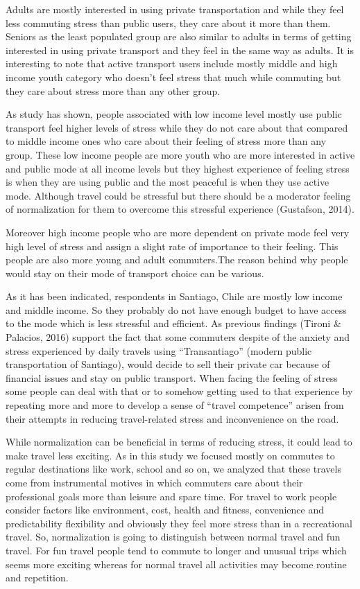 \documentclass[
11pt, %
oneside, %
english, %
singlespacing, %
]{macthesis} %
\begin{document}
Adults are mostly interested in using private transportation and while they feel less commuting stress than public users, they care about it more than them. Seniors as the least populated group are also similar to adults in terms of getting interested in using private transport and they feel in the same way as adults. It is interesting to note that active transport users include mostly middle and high income youth category who doesn't feel stress that much while commuting but they care about stress more than any other group.

As study has shown, people associated with low income level mostly use public transport feel higher levels of stress while they do not care about that compared to middle income ones who care about their feeling of stress more than any group. These low income people are more youth who are more interested in active and public mode at all income levels but they highest experience of feeling stress is when they are using public and the most peaceful is when they use active mode. Although travel could be stressful but there should be a moderator feeling of normalization for them to overcome this stressful experience (Gustafson, 2014).

Moreover high income people who are more dependent on private mode feel very high level of stress and assign a slight rate of importance to their feeling. This people are also more young and adult commuters.The reason behind why people would stay on their mode of transport choice can be various.

As it has been indicated, respondents in Santiago, Chile are mostly low income and middle income. So they probably do not have enough budget to have access to the mode which is less stressful and efficient. As previous findings (Tironi \& Palacios, 2016) support the fact that some commuters despite of the anxiety and stress experienced by daily travels using ``Transantiago'' (modern public transportation of Santiago), would decide to sell their private car because of financial issues and stay on public transport. When facing the feeling of stress some people can deal with that or to somehow getting used to that experience by repeating more and more to develop a sense of ``travel competence'' arisen from their attempts in reducing travel-related stress and inconvenience on the road.

While normalization can be beneficial in terms of reducing stress, it could lead to make travel less exciting. As in this study we focused mostly on commutes to regular destinations like work, school and so on, we analyzed that these travels come from instrumental motives in which commuters care about their professional goals more than leisure and spare time. For travel to work people consider factors like environment, cost, health and fitness, convenience and predictability flexibility and obviously they feel more stress than in a recreational travel. So, normalization is going to distinguish between normal travel and fun travel. For fun travel people tend to commute to longer and unusual trips which seems more exciting whereas for normal travel all activities may become routine and repetition.
\end{document}
